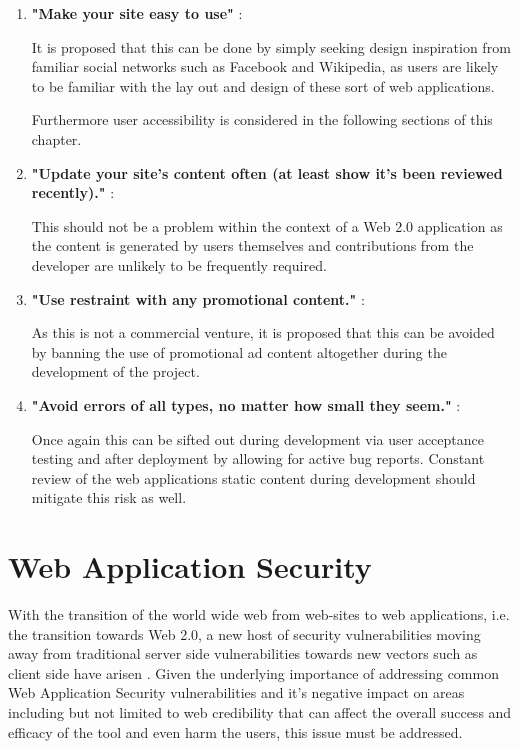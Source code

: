 \begin{enumerate}
    \item \textbf{"Make your site easy to use"} \cite{Fogg2002a}:
    
    It is proposed that this can be done by simply seeking design inspiration from familiar social networks such as Facebook and Wikipedia, as users are likely to be familiar with the lay out and design of these sort of web applications\cite{Fogg2002a}.
    
    Furthermore user accessibility is considered in the following sections of this chapter.
    
    \item \textbf{"Update your site's content often (at least show it's been reviewed recently)."} \cite{Fogg2002a}:
    
    This should not be a problem within the context of a Web 2.0 application as the content is generated by users themselves and contributions from the developer are unlikely to be frequently required.
    
    \item \textbf{"Use restraint with any promotional content."} \cite{Fogg2002a}:
    
    As this is not a commercial venture, it is proposed that this can be avoided by banning the use of promotional ad content altogether during the development of the project.
    
    \item \textbf{"Avoid errors of all types, no matter how small they seem."} \cite{Fogg2002a}:
    
    Once again this can be sifted out during development via user acceptance testing and after deployment by allowing for active bug reports. Constant review of the web applications static content during development should mitigate this risk as well.
\end{enumerate}
\newpage


\section{Web Application Security}

With the transition of the world wide web from web-sites to web applications, i.e. the transition towards Web 2.0, a new host of security vulnerabilities moving away from traditional server side vulnerabilities towards new vectors such as client side have arisen \cite{Dayfdd2011}. Given the underlying importance of addressing common Web Application Security vulnerabilities \cite{Dayfdd2011} and it's negative impact on areas including but not limited to web credibility \cite{Fogg2002a,Fogg1999} that can affect the overall success and efficacy of the tool and even harm the users, this issue must be addressed.

